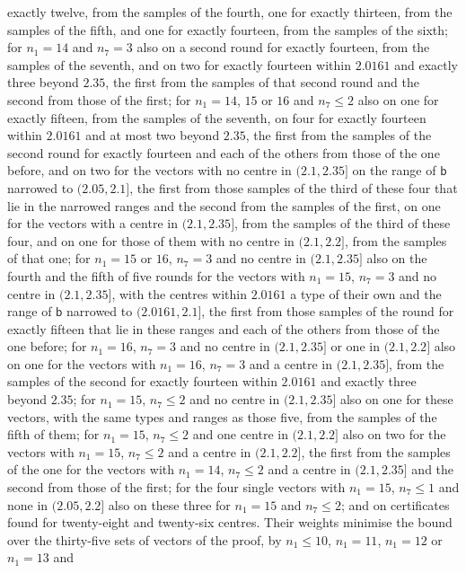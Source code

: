 \documentclass[11pt,reqno]{amsart}
\renewcommand{\_}{\origunderscore\allowbreak}
\numberwithin{equation}{section}
\theoremstyle{plain}
\theoremstyle{definition}
\theoremstyle{remark}
\begin{document}
exactly twelve, from the samples of the fourth, one for exactly thirteen,
from the samples of the fifth, and one for exactly fourteen, from the
samples of the sixth; for $n_1=14$ and $n_7=3$ also on a second round for
exactly fourteen, from the samples of the seventh, and on two for exactly
fourteen within $2.0161$ and exactly three beyond $2.35$, the first from
the samples of that second round and the second from those of the first;
for $n_1=14$, $15$ or $16$ and $n_7\le2$ also on one for exactly fifteen, from the
samples of the seventh, on four for exactly fourteen within $2.0161$ and at
most two beyond $2.35$, the first from the samples of the second round for
exactly fourteen and each of the others from those of the one before, and
on two for the vectors with no centre in $(2.1,2.35]$ on the range of
$\mathsf b$ narrowed to $(2.05,2.1]$, the first from those samples of the
third of these four that lie in the narrowed ranges and the second from the
samples of the first, on one for the vectors with a centre in $(2.1,2.35]$,
from the samples of the third of these four, and on one for those of them
with no centre in $(2.1,2.2]$, from the samples of that one; for $n_1=15$
or $16$, $n_7=3$ and no centre in $(2.1,2.35]$ also on the fourth and the
fifth of five rounds for the vectors with $n_1=15$, $n_7=3$ and no centre
in $(2.1,2.35]$, with the centres within $2.0161$ a type of their own and
the range of $\mathsf b$ narrowed to $(2.0161,2.1]$, the first from those
samples of the round for exactly fifteen that lie in these ranges and each
of the others from those of the one before; for $n_1=16$, $n_7=3$ and no
centre in $(2.1,2.35]$ or one in $(2.1,2.2]$ also on one for the vectors
with $n_1=16$, $n_7=3$ and a centre in $(2.1,2.35]$, from the samples of the second for exactly
fourteen within $2.0161$ and exactly three beyond $2.35$; for $n_1=15$,
$n_7\le2$ and no centre in $(2.1,2.35]$ also on one for these vectors,
with the same types and ranges as those five, from the samples of the fifth
of them; for $n_1=15$, $n_7\le2$ and one centre in $(2.1,2.2]$ also on two
for the vectors with $n_1=15$, $n_7\le2$ and a centre in $(2.1,2.2]$, the
first from the samples of the one for the vectors with $n_1=14$,
$n_7\le2$ and a centre in $(2.1,2.35]$ and the second from those of the
first; for the four single vectors with $n_1=15$, $n_7\le1$ and none in
$(2.05,2.2]$ also on these three for $n_1=15$ and $n_7\le2$; and on
certificates found for twenty-eight and twenty-six centres. Their weights
minimise the bound over the thirty-five sets
of vectors of the proof, by $n_1\le10$, $n_1=11$, $n_1=12$ or $n_1=13$ and
\end{document}
